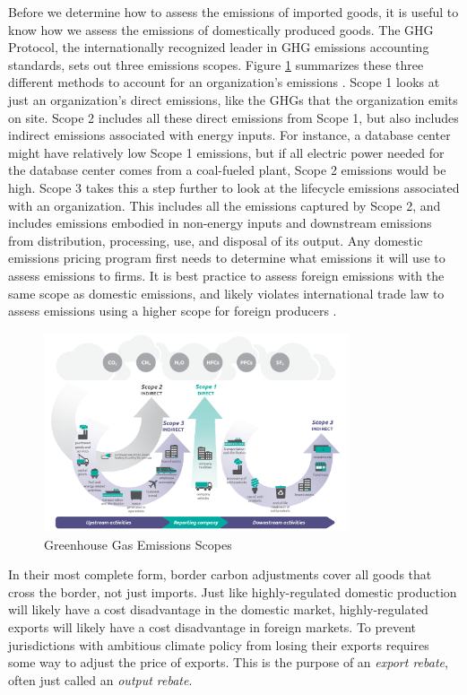 Before we determine how to assess the emissions of imported goods, it is useful to know how we assess the emissions of domestically produced goods. The GHG Protocol, the internationally recognized leader in GHG emissions accounting standards, sets out three emissions scopes. Figure \ref{scopes} summarizes these three different methods to account for an organization’s emissions \citep{ghg_protocol_2011}. Scope 1 looks at just an organization’s direct emissions, like the GHGs that the organization emits on site. Scope 2 includes all these direct emissions from Scope 1, but also includes indirect emissions associated with energy inputs. For instance, a database center might have relatively low Scope 1 emissions, but if all electric power needed for the database center comes from a coal-fueled plant, Scope 2 emissions would be high. Scope 3 takes this a step further to look at the lifecycle emissions associated with an organization. This includes all the emissions captured by Scope 2, and includes emissions embodied in non-energy inputs and downstream emissions from distribution, processing, use, and disposal of its output. Any domestic emissions pricing program first needs to determine what emissions it will use to assess emissions to firms. It is best practice to assess foreign emissions with the same scope as domestic emissions, and likely violates international trade law to assess emissions using a higher scope for foreign producers \citep{cosbey2020developing}.

\begin{figure}
	\caption{Greenhouse Gas Emissions Scopes \citep{ghg_protocol_2011}\label{scopes}}
	\centering
	\includegraphics[width=0.8\textwidth]{figures/chapter2_figures/ghg_scope.png}
\end{figure}

In their most complete form, border carbon adjustments cover all goods that cross the border, not just imports. Just like highly-regulated domestic production will likely have a cost disadvantage in the domestic market, highly-regulated exports will likely have a cost disadvantage in foreign markets. To prevent jurisdictions with ambitious climate policy from losing their exports requires some way to adjust the price of exports. This is the purpose of an \emph{export rebate}, often just called an \emph{output rebate}.


